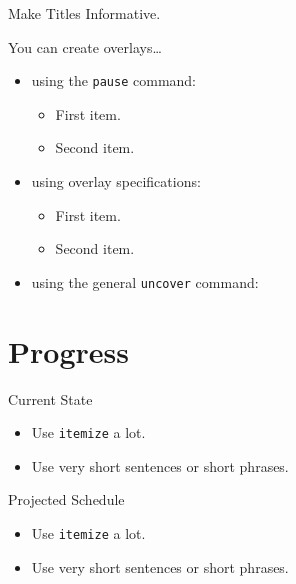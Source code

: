\documentclass{beamer}
\begin{document}
\begin{frame}{Make Titles Informative.}

  You can create overlays\dots
  \begin{itemize}
  \item using the \texttt{pause} command:
    \begin{itemize}
    \item
      First item.
      \pause
    \item    
      Second item.
    \end{itemize}
  \item
    using overlay specifications:
    \begin{itemize}
    \item<3->
      First item.
    \item<4->
      Second item.
    \end{itemize}
  \item
    using the general \texttt{uncover} command:
    \begin{itemize}
    \end{itemize}
  \end{itemize}
\end{frame}

\section{Progress}

\begin{frame}{Current State}

  \begin{itemize}
  \item
    Use \texttt{itemize} a lot.
  \item
    Use very short sentences or short phrases.
  \end{itemize}
\end{frame}

\begin{frame}{Projected Schedule}

  \begin{itemize}
  \item
    Use \texttt{itemize} a lot.
  \item
    Use very short sentences or short phrases.
  \end{itemize}
\end{frame}
\end{document}
